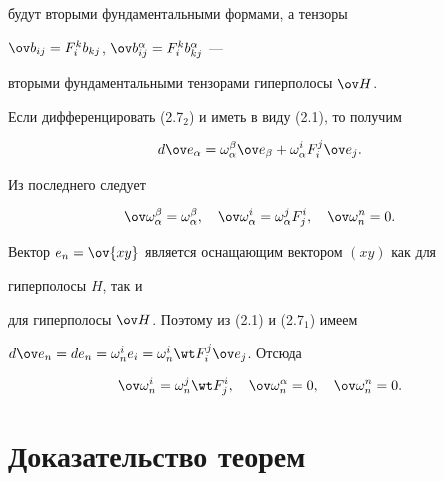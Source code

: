 будут вторыми фундаментальными формами, а тензоры 


$\ov b_{ij}=F^k_i b_{kj}$, $\ov b^\alpha_{ij}=F^k_i b^\alpha_{kj}$ --- 


вторыми фундаментальными тензорами гиперполосы $\ov H$. 


 


Если дифференцировать (2.7${}_2$) и иметь в виду (2.1), то получим 


$$ 


d\ov e_\alpha=\omega^\beta_\alpha\ov e_\beta+\omega^i_\alpha 


F^j_i\ov e_j. 


$$ 


Из последнего следует 


\begin{equation} 


\ov\omega^\beta_\alpha=\omega^\beta_\alpha,\quad 


\ov\omega^i_\alpha=\omega^j_\alpha F^i_j,\quad 


\ov\omega^n_n=0. 


\end{equation} 


Вектор $e_n=\ov{xy}$ является оснащающим вектором $(xy)$ как для 


гиперполосы $H$, так и 


для гиперполосы $\ov H$. Поэтому из (2.1) и (2.7${}_1$) имеем 


$d\ov e_n=d e_n=\omega^i_n e_i=\omega^i_n\wt F^j_i\ov e_j$. Отсюда 


\begin{equation} 


\ov\omega^i_n=\omega^j_n\wt F^i_j,\quad 


\ov\omega^\alpha_n=0,\quad \ov \omega^n_n=0. 


\end{equation} 


 


\section{Доказательство теорем} 


 


